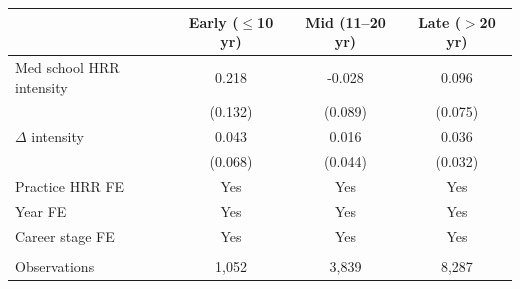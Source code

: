 
\begin{tabular}{lccc}
\toprule
 & Early ($\leq$10 yr) & Mid (11--20 yr) & Late ($>$20 yr)\\
\midrule
Med school HRR intensity & 0.218 & -0.028 & 0.096\\
 & (0.132) & (0.089) & (0.075)\\
$\Delta$ intensity & 0.043 & 0.016 & 0.036\\
 & (0.068) & (0.044) & (0.032)\\
\addlinespace
Practice HRR FE & Yes & Yes & Yes\\
Year FE & Yes & Yes & Yes\\
Career stage FE & Yes & Yes & Yes\\
\midrule\\
Observations & 1,052 & 3,839 & 8,287\\
\bottomrule
\end{tabular}
